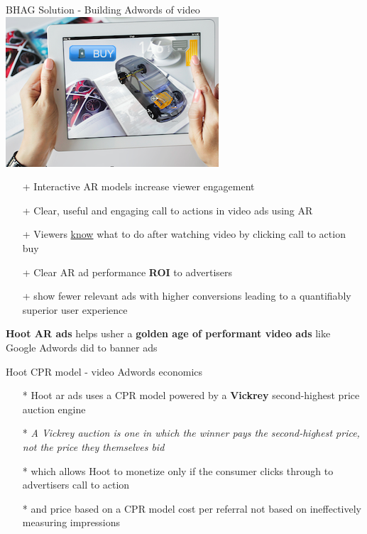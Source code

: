 \documentclass[12pt]{beamer}
\begin{document}
\begin{frame}[fragile]{BHAG Solution -  Building Adwords of video \includegraphics[scale=.1]{static/arad/arad5} }
\begin{itemize}
\item[+]Interactive AR models increase viewer engagement
\pause	
\item[+]Clear, useful and engaging call to actions in video ads using AR
\pause
\item[+]Viewers \underline{know} what to do after watching video by clicking call to action buy 
\pause
\item[+]Clear AR ad performance \textbf{ROI} to advertisers 
\pause
\item[+]show fewer relevant ads with higher conversions leading to a quantifiably superior user experience 
\pause
\end{itemize}
\textbf{Hoot AR ads} helps usher a \textbf{golden age of performant video ads }like Google Adwords did to banner ads


\end{frame}

\begin{frame}[t]{Hoot CPR model - video Adwords economics}
\begin{itemize}
\item[*]Hoot ar ads uses a CPR model powered by a \textbf{Vickrey} second-highest price auction engine
\pause
\item[*]\emph{A Vickrey auction is one in which the winner pays the second-highest price, not the price they themselves bid}
\pause
\item[*]which allows Hoot to monetize only if the consumer clicks through to advertisers call to action
\pause
\item[*]and price based on a CPR model cost per referral not based on ineffectively measuring impressions
\end{itemize}
\end{frame}
\end{document}

